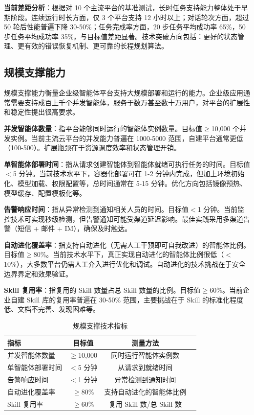 \documentclass[12pt,a4paper]{article}
\begin{document}
\textbf{当前差距分析}：根据对 10 个主流平台的基准测试，长时任务支持能力整体处于早期阶段。连续运行时长方面，仅 3 个平台支持 12 小时以上；对话轮次方面，超过 50 轮后性能普遍下降 30-50\%；任务完成率方面，20 步任务平均成功率 65\%，50 步任务平均成功率 35\%，与目标值差距显著。技术突破方向包括：更好的状态管理、更有效的错误恢复机制、更可靠的长程规划算法。

\subsection{规模支撑能力}

规模支撑能力衡量企业级智能体平台支持大规模部署和运行的能力。企业级应用通常需要支持成百上千个并发智能体，服务于数万甚至数十万用户，对平台的扩展性和稳定性提出很高要求。

\textbf{并发智能体数量}：指平台能够同时运行的智能体实例数量。目标值$\geq$10,000 个并发实例。当前主流云平台的并发能力普遍在 1000-5000 范围，自建平台通常更低（100-500）。扩展瓶颈在于资源调度效率和状态管理开销。

\textbf{单智能体部署时间}：指从请求创建智能体到智能体就绪可执行任务的时间。目标值$<$5 分钟。当前技术水平下，容器化部署可在 1-2 分钟内完成，但加上环境初始化、模型加载、权限配置等，总时间通常在 5-15 分钟。优化方向包括镜像预热、模型缓存、配置模板化等。

\textbf{告警响应时间}：指从异常检测到通知相关人员的时间。目标值$<$1 分钟。当前监控技术可实现秒级检测，但告警通知可能受渠道延迟影响。最佳实践采用多渠道告警（短信 + 邮件 + IM），确保及时触达。

\textbf{自动进化覆盖率}：指支持自动进化（无需人工干预即可自我改进）的智能体比例。目标值$\geq$80\%。当前技术水平下，真正实现自动进化的智能体比例很低（$<$10\%），大多数平台仍需人工介入进行优化和调试。自动进化的技术挑战在于安全边界界定和效果验证。

\textbf{Skill 复用率}：指复用的 Skill 数量占总 Skill 数量的比例。目标值$\geq$60\%。当前企业自建 Skill 库的复用率普遍在 30-50\% 范围，主要挑战在于 Skill 的标准化程度低、文档不完善、发现困难等。

\begin{table}[h]
\centering
\caption{规模支撑技术指标}
\label{tab:scale}
\begin{tabular}{@{}lccl@{}}
\toprule
\textbf{指标} & \textbf{目标值} & \textbf{测量方法} \\
\midrule
并发智能体数量 & $\geq$10,000 & 同时运行智能体实例数 \\
单智能体部署时间 & $<$5 分钟 & 从请求到就绪时间 \\
告警响应时间 & $<$1 分钟 & 异常检测到通知时间 \\
自动进化覆盖率 & $\geq$80\% & 支持自动进化的智能体比例 \\
Skill 复用率 & $\geq$60\% & 复用 Skill 数/总 Skill 数 \\
\bottomrule
\end{tabular}
\end{table}
\end{document}
